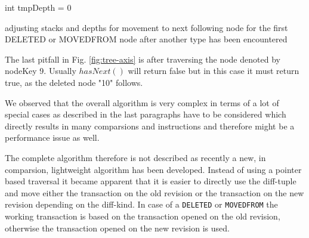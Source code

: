 \begin{algorithm}[Hhtbp]
{}
\BlankLine
int tmpDepth = 0\;
\caption{adjusting stacks and depths for movement to next following node for the first DELETED or MOVEDFROM node after another type has been encountered}\label{algo:popStacks}
\end{algorithm}

The last pitfall in Fig. \ref{fig:tree-axis} is after traversing the node denoted by nodeKey 9. Usually $hasNext()$ will return false but in this case it must return true, as the deleted node "10" follows.

We observed that the overall algorithm is very complex in terms of a lot of special cases as described in the last paragraphs have to be considered which directly results in many comparsions and instructions and therefore might be a performance issue as well.

The complete algorithm therefore is not described as recently a new, in comparsion, lightweight algorithm has been developed. Instead of using a pointer based traversal it became apparent that it is easier to directly use the diff-tuple and move either the transaction on the old revision or the transaction on the new revision depending on the diff-kind. In case of a \texttt{DELETED} or \texttt{MOVEDFROM} the working transaction is based on the transaction opened on the old revision, otherwise the transaction opened on the new revision is used.

